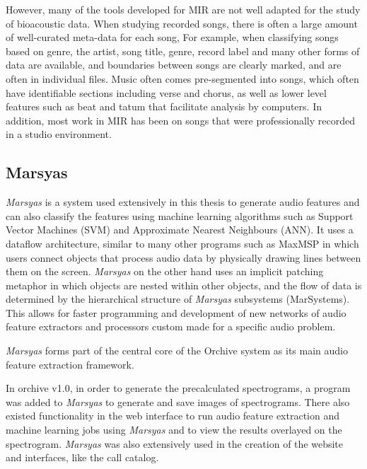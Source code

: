 \documentclass[12pt,oneside]{book}
\begin{document}
However, many of the tools developed for MIR are not well adapted for
the study of bioacoustic data.  When studying recorded songs, there is
often a large amount of well-curated meta-data for each song, For
example, when classifying songs based on genre, the artist, song
title, genre, record label and many other forms of data are available,
and boundaries between songs are clearly marked, and are often in
individual files.  Music often comes pre-segmented into songs, which
often have identifiable sections including verse and chorus, as well
as lower level features such as beat and tatum that facilitate
analysis by computers.  In addition, most work in MIR has been on
songs that were professionally recorded in a studio environment.

\subsection{Marsyas}
\label{sec:introduction:marsyas}

\textit{Marsyas} \cite{tzanetakis00} is a system used extensively in this
thesis to generate audio features and can also classify the features
using machine learning algorithms such as Support Vector Machines
(SVM) and Approximate Nearest Neighbours (ANN).  It uses a dataflow
architecture, similar to many other programs such as
MaxMSP\cite{puckette1998real} in which users connect objects that
process audio data by physically drawing lines between them on the
screen.  \textit{Marsyas} on the other hand uses an implicit patching metaphor
\cite{bray2005implicit} in which objects are nested within other
objects, and the flow of data is determined by the hierarchical
structure of \textit{Marsyas} subsystems (MarSystems).  This allows for faster
programming and development of new networks of audio feature
extractors and processors custom made for a specific audio problem.

\textit{Marsyas} forms part of the central core of the Orchive system as its
main audio feature extraction framework.

In orchive v1.0, in order to generate the precalculated spectrograms, a
program was added to \textit{Marsyas} to generate and save images of
spectrograms.  There also existed functionality in the web interface
to run audio feature extraction and machine learning jobs using
\textit{Marsyas} and to view the results overlayed on the spectrogram.  \textit{Marsyas}
was also extensively used in the creation of the website and
interfaces, like the call catalog.
\end{document}
